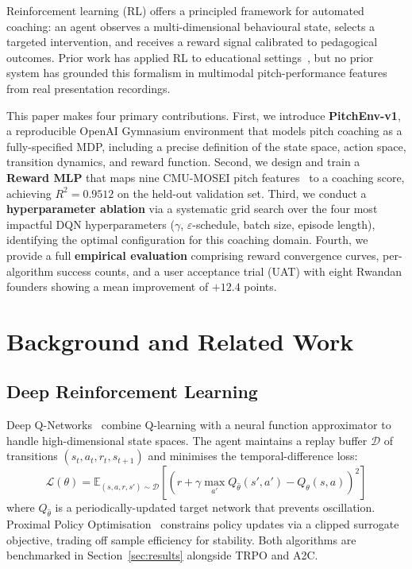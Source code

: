 \documentclass{article}
\begin{document}
Reinforcement learning (RL) offers a principled framework for automated
coaching: an agent observes a multi-dimensional behavioural state,
selects a targeted intervention, and receives a reward signal calibrated
to pedagogical outcomes.
Prior work has applied RL to educational settings~\citep{mnih2015,schulman2017},
but no prior system has grounded this formalism in multimodal
pitch-performance features from real presentation recordings.

This paper makes four primary contributions.
First, we introduce \textbf{PitchEnv-v1}, a reproducible OpenAI Gymnasium
environment that models pitch coaching as a fully-specified MDP, including a
precise definition of the state space, action space, transition dynamics, and
reward function.
Second, we design and train a \textbf{Reward MLP} that maps nine CMU-MOSEI
pitch features~\citep{zadeh2018} to a coaching score, achieving $R^2 = 0.9512$
on the held-out validation set.
Third, we conduct a \textbf{hyperparameter ablation} via a systematic grid
search over the four most impactful DQN hyperparameters ($\gamma$,
$\varepsilon$-schedule, batch size, episode length), identifying the
optimal configuration for this coaching domain.
Fourth, we provide a full \textbf{empirical evaluation} comprising reward
convergence curves, per-algorithm success counts, and a user acceptance trial
(UAT) with eight Rwandan founders showing a mean improvement of $+12.4$ points.


\FloatBarrier
\section{Background and Related Work}

\FloatBarrier
\subsection{Deep Reinforcement Learning}

Deep Q-Networks~\citep{mnih2015} combine Q-learning with a neural function
approximator to handle high-dimensional state spaces. The agent maintains
a replay buffer $\mathcal{D}$ of transitions $(s_t, a_t, r_t, s_{t+1})$
and minimises the temporal-difference loss:
\begin{equation}
\mathcal{L}(\theta) = \mathbb{E}_{(s,a,r,s') \sim \mathcal{D}}
  \!\left[\!\left(r + \gamma \max_{a'} Q_{\hat\theta}(s',a') - Q_\theta(s,a)\right)^{\!2}\right]
\label{eq:dqn_loss}
\end{equation}
where $Q_{\hat\theta}$ is a periodically-updated target network that prevents
oscillation. Proximal Policy Optimisation~\citep{schulman2017} constrains
policy updates via a clipped surrogate objective, trading off sample
efficiency for stability. Both algorithms are benchmarked in
Section~\ref{sec:results} alongside TRPO and A2C.
\end{document}
